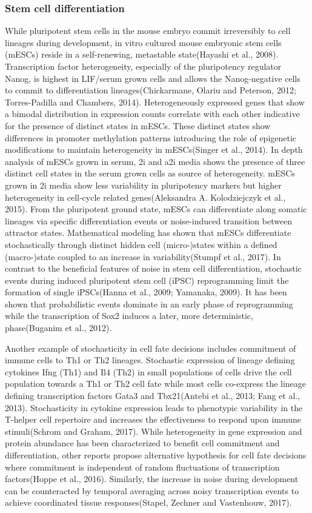 \subsubsection*{Stem cell differentiation}

While pluripotent stem cells in the mouse embryo commit irreversibly to cell lineages during development, in vitro cultured mouse embryonic stem cells (mESCs) reside in a self-renewing, metastable state(Hayashi et al., 2008). Transcription factor heterogeneity, especially of the pluripotency regulator Nanog, is highest in LIF/serum grown cells and allows the Nanog-negative cells to commit to differentiation lineages(Chickarmane, Olariu and Peterson, 2012; Torres-Padilla and Chambers, 2014). Heterogeneously expressed genes that show a bimodal distribution in expression counts correlate with each other indicative for the presence of distinct states in mESCs. These distinct states show differences in promoter methylation patterns introducing the role of epigenetic modifications to maintain heterogeneity in mESCs(Singer et al., 2014). In depth analysis of mESCs grown in serum, 2i and a2i media shows the presence of three distinct cell states in the serum grown cells as source of heterogeneity. mESCs grown in 2i media show less variability in pluripotency markers but higher heterogeneity in cell-cycle related genes(Aleksandra A. Kolodziejczyk et al., 2015). From the pluripotent ground state, mESCs can differentiate along somatic lineages via specific differentiation events or noise-induced transition between attractor states. Mathematical modeling has shown that mESCs differentiate stochastically through distinct hidden cell (micro-)states within a defined (macro-)state coupled to an increase in variability(Stumpf et al., 2017).
In contrast to the beneficial features of noise in stem cell differentiation, stochastic events during induced pluripotent stem cell (iPSC) reprogramming limit the formation of single iPSCs(Hanna et al., 2009; Yamanaka, 2009). It has been shown that probabilistic events dominate in an early phase of reprogramming while the transcription of Sox2 induces a later, more deterministic, phase(Buganim et al., 2012).

Another example of stochasticity in cell fate decisions includes commitment of immune cells to Th1 or Th2 lineages. Stochastic expression of lineage defining cytokines Ifng (Th1) and Il4 (Th2) in small populations of cells drive the cell population towards a Th1 or Th2 cell fate while most cells co-express the lineage defining transcription factors Gata3 and Tbx21(Antebi et al., 2013; Fang et al., 2013). Stochasticity in cytokine expression leads to phenotypic variability in the T-helper cell repertoire and increases the effectiveness to respond upon immune stimuli(Schrom and Graham, 2017).
While heterogeneity in gene expression and protein abundance has been characterized to benefit cell commitment and differentiation, other reports propose alternative hypothesis for cell fate decisions where commitment is independent of random fluctuations of transcription factors(Hoppe et al., 2016). Similarly, the increase in noise during development can be counteracted by temporal averaging across noisy transcription events to achieve coordinated tissue responses(Stapel, Zechner and Vastenhouw, 2017). 

